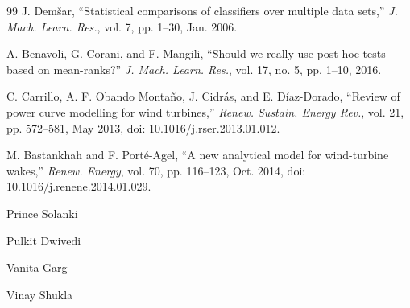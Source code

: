 \begin{thebibliography}{99}
J. Dem\v{s}ar, ``Statistical comparisons of classifiers over multiple data sets,'' \textit{J. Mach. Learn. Res.}, vol. 7, pp. 1--30, Jan. 2006.

A. Benavoli, G. Corani, and F. Mangili, ``Should we really use post-hoc tests based on mean-ranks?'' \textit{J. Mach. Learn. Res.}, vol. 17, no. 5, pp. 1--10, 2016.

C. Carrillo, A. F. Obando Monta\~no, J. Cidr\'as, and E. D\'iaz-Dorado, ``Review of power curve modelling for wind turbines,'' \textit{Renew. Sustain. Energy Rev.}, vol. 21, pp. 572--581, May 2013, doi: 10.1016/j.rser.2013.01.012.

M. Bastankhah and F. Port\'e-Agel, ``A new analytical model for wind-turbine wakes,'' \textit{Renew. Energy}, vol. 70, pp. 116--123, Oct. 2014, doi: 10.1016/j.renene.2014.01.029.

\end{thebibliography}

\begin{IEEEbiographynophoto}{Prince Solanki}
\end{IEEEbiographynophoto}

\begin{IEEEbiographynophoto}{Pulkit Dwivedi}
\end{IEEEbiographynophoto}

\begin{IEEEbiographynophoto}{Vanita Garg}
\end{IEEEbiographynophoto}

\begin{IEEEbiographynophoto}{Vinay Shukla}
\end{IEEEbiographynophoto}

